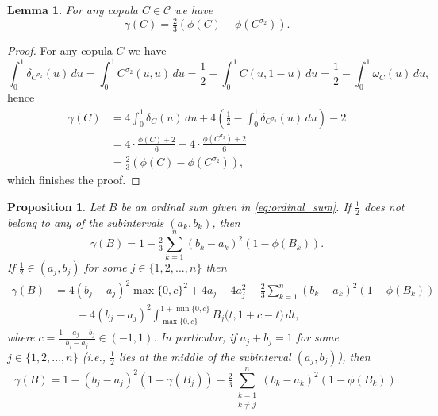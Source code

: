 \documentclass[12pt,a4paper]{amsart}
\newtheorem{proposition}[theorem]{Proposition}
\newtheorem{lemma}[theorem]{Lemma}
\theoremstyle{definition}
\newcommand{\CC}{\mathcal{C}}
\begin{document}
\begin{lemma} \label{lem:gamma-phi}
For any copula $C \in \CC$ we have 
$$\gamma(C) = \tfrac23 (\phi(C)-\phi(C^{\sigma_2})).$$
\end{lemma}

\begin{proof}
For any copula $C$ we have
$$\int_0^1 \delta_{C^{\sigma_2}}(u) \, du=\int_0^1 C^{\sigma_2}(u,u) \, du=\frac12-\int_0^1 C(u,1-u) \, du= \frac12-\int_0^1 \omega_C(u) \, du,$$
hence
\begin{align*}
\gamma(C) &=4\int_0^1 \delta_{C}(u) \, du+4\left(\frac12-\int_0^1 \delta_{C^{\sigma_2}}(u) \, du\right)-2 \\
&=4\cdot\frac{\phi(C)+2}{6}-4\cdot\frac{\phi(C^{\sigma_2})+2}{6} \\
&=\tfrac23 (\phi(C)-\phi(C^{\sigma_2})),
\end{align*}    
which finishes the proof.
\end{proof}

\begin{proposition}\label{prop:ordinal-gamma}
Let $B$ be an ordinal sum given in \eqref{eq:ordinal_sum}. If $\tfrac12$ does not belong to any of the subintervals $(a_k, b_k)$, then 
\begin{equation} \label{eq:ordinal-gamma-1}
        \gamma(B) =  1 - \tfrac23\sum_{k=1}^n (b_k-a_k)^2(1-\phi(B_k)). 
\end{equation}  
If $\tfrac12 \in (a_j, b_j)$ for some $j \in \{1, 2, ..., n\}$ then
\begin{align*}
   \gamma(B) &= 4(b_j-a_j)^2\max\{0,c\}^2 + 4a_j - 4a_j^2 - \tfrac23\sum_{k=1}^n (b_k-a_k)^2(1-\phi(B_k)) \\
   &\qquad+ 4(b_j-a_j)^2\int_{\max\{0,c\}}^{1+\min\{0,c\}} B_j\big(t,1+c-t\big) \, dt,
\end{align*}
where $c=\frac{1-a_j-b_j}{b_j-a_j} \in (-1,1)$.
In particular, if $a_j + b_j = 1$ for some $j \in \{1, 2, ..., n\}$ (i.e., $\tfrac12$ lies at the middle of the subinterval $(a_j, b_j)$), then
\begin{equation} \label{eq:ordinal-gamma-3}
        \gamma(B) =  1 - (b_j-a_j)^2(1-\gamma(B_j)) - \tfrac23\sum_{\substack{k=1 \\ k\ne j}}^n (b_k-a_k)^2(1-\phi(B_k)). 
\end{equation}  
\end{proposition}
\end{document}
